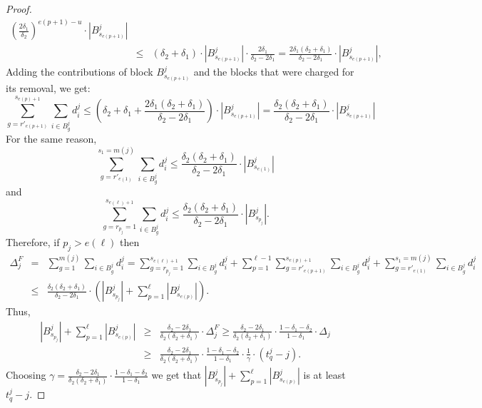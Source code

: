 \documentclass[11pt]{article}
\begin{document}
\begin{proof}
\begin{eqnarray*}
\left(\frac{2\delta_1}{\delta_2}\right)^{e(p+1)-u}\cdot|B^j_{s_{e(p+1)}}|\\
&\le & (\delta_2+\delta_1) \cdot |B^j_{s_{e(p+1)}}| \cdot
\frac{2\delta_1}{\delta_2- 2\delta_1}
= \frac{2\delta_1(\delta_2+\delta_1)}{\delta_2- 2\delta_1}  \cdot |B^j_{s_{e(p+1)}}|,
\end{eqnarray*}
Adding the contributions of block $B^j_{s_{e(p+1)}}$
and the blocks that were charged for its removal, we get:
$$
\sum_{g=r'_{e(p+1)}}^{s_{e(p)+1}}\sum _{i\in B_g^j} d_i^j
\le \left(\delta_2+\delta_1+\frac{2\delta_1(\delta_2+\delta_1)}{\delta_2- 2\delta_1}\right)
\cdot |B^j_{s_{e(p+1)}}| =
\frac{\delta_2(\delta_2+\delta_1)}{\delta_2- 2\delta_1}
\cdot |B^j_{s_{e(p+1)}}|
$$
For the same reason,
$$\sum_{g=r'_{e(1)}}^{s_1=m(j)} \sum _{i\in B_g^j} d_i^j\le
\frac{\delta_2(\delta_2+\delta_1)}{\delta_2- 2\delta_1}
\cdot |B^j_{s_{e(1)}}|$$ and
$$ \sum_{g=r_{p_j}=1}^{s_{e(\ell)+1}} \sum _{i\in B_g^j} d_i^j
\le \frac{\delta_2(\delta_2+\delta_1)}{\delta_2- 2\delta_1}
 \cdot |B^j_{s_{p_j}}|.$$
Therefore, if $p_j > e(\ell)$ then
\begin{eqnarray}\label{eq: delta_j^F}
\Delta_j^F&=& \sum_{g= 1}^{m(j)} \sum_{i\in B^j_g} d_i^j
= \sum_{g=r_{p_j}=1}^{s_{e(\ell)+1}} \sum _{i\in B_g^j} d_i^j
+\sum_{p=1}^{\ell-1} \sum_{g=r'_{e(p+1)}}^{s_{e(p)+1}}\sum _{i\in B_g^j} d_i^j
+\sum_{g=r'_{e(1)}}^{s_1=m(j)} \sum _{i\in B_g^j} d_i^j \nonumber\\
&\le& \frac{\delta_2(\delta_2+\delta_1)}{\delta_2- 2\delta_1}
\cdot\left(|B^j_{s_{p_j}}| +\sum_{p=1}^{\ell}  |B^j_{s_{e(p)}}|\right).
\end{eqnarray}
Thus,
\begin{eqnarray}\label{eq: number of items}
|B^j_{s_{p_j}}| +\sum_{p=1}^{\ell}  |B^j_{s_{e(p)}}|&\ge&
\frac{\delta_2- 2\delta_1}{\delta_2(\delta_2+\delta_1)}\cdot \Delta_j^F
\ge \frac{\delta_2- 2\delta_1}{\delta_2(\delta_2+\delta_1)}
\cdot \frac{1-\delta_1-\delta_2}{1-\delta_1} \cdot \Delta_j \nonumber\\
&\ge& \frac{\delta_2- 2\delta_1}{\delta_2(\delta_2+\delta_1)}
\cdot \frac{1-\delta_1-\delta_2}{1-\delta_1} \cdot\frac{1}{\gamma}\cdot (t_q^j-j).
\end{eqnarray}
Choosing $\gamma = \frac{\delta_2- 2\delta_1}{\delta_2(\delta_2+\delta_1)}
\cdot \frac{1-\delta_1-\delta_2}{1-\delta_1}$ we get that
$|B^j_{s_{p_j}}| +\sum_{p=1}^{\ell}  |B^j_{s_{e(p)}}|$ is at least $t_q^j-j$.


\end{proof}
\end{document}
